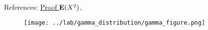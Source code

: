 
References: \href{http://herbsusmann.com/distributions/gamma-distribution-variance-proof.html}{Proof $\operatorname{\mathbf{E}}(X^2)$}, 


\begin{figure}[h!]
\centering
\texttt{[image: ../lab/gamma\_distribution/gamma\_figure.png]}
\end{figure}
